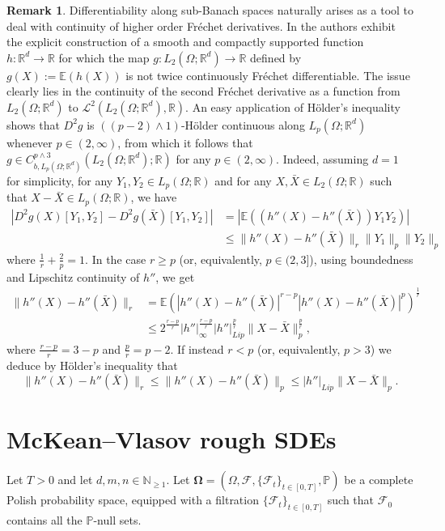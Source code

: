 \documentclass[10pt, a4paper]{article} %
\newcommand{\R}{\mathbb{R}}
\newcommand{\E}{\mathbb{E}}
\theoremstyle{definition}
\newtheorem{rmk}[defn]{Remark}
\theoremstyle{plain}
\begin{document}
\begin{rmk} \label{rmk:counterexampleCD}
    Differentiability along sub-Banach spaces naturally arises as a tool to deal with continuity of higher order Fréchet derivatives. 
    In \cite[Remark 5.80]{CARMONADELARUE_volumeI} the authors exhibit the explicit construction of a smooth and compactly supported function $h:\R^d \to \R$ for which the map $g : L_2(\Omega;\R^d) \to \R$ defined by $g(X) := \E(h(X))$ is not twice continuously Fréchet differentiable. 
    The issue clearly lies in the continuity of the second Fréchet derivative as a function from $L_2(\Omega;\R^d)$ to $\mathscr{L}^2(L_2(\Omega;\R^d),\R)$.
    An easy application of H\"older's inequality shows that $D^2g$ is $((p-2) \wedge 1)$-H\"older continuous along $L_p(\Omega;\R^d)$ whenever $p \in (2,\infty)$, from which it follows that $g \in C^{p\wedge 3}_{b,L_p(\Omega;\R^d)}(L_2(\Omega;\R^d);\R)$ for any $p \in (2,\infty)$. 
    Indeed, assuming $d=1$ for simplicity, for any $Y_1,Y_2 \in L_p(\Omega;\R)$ and for any $X,\bar X \in L_2(\Omega;\R)$ such that $X - \bar X \in L_p(\Omega;\R)$, we have \begin{align*}
        |D^2g(X) [Y_1,Y_2] - D^2g(\bar X) [Y_1,Y_2] | &= |\E( (h''(X) - h''(\bar X)) Y_1 Y_2)| \\
        &\le \|h''(X) -h''(\bar X)\|_r \|Y_1\|_p \|Y_2\|_p
    \end{align*}
    where $\frac{1}{r} + \frac{2}{p} = 1$.
    In the case $r \ge p$ (or, equivalently, $p \in (2,3]$), using boundedness and Lipschitz continuity of $h''$, we get
    \begin{align*} 
        \|h''(X) - h''(\bar X)\|_r &= \E(|h''(X) - h''(\bar X)|^{r-p} |h''(X) - h''(\bar X)|^{p})^\frac{1}{r} \\
        &\le 2^{\frac{r-p}{r}} |h''|_\infty^{\frac{r-p}{r}} |h''|_{Lip}^\frac{p}{r} \|X- \bar X\|_p ^{\frac{p}{r}} ,
    \end{align*}
    where $\frac{r-p}{r}=3-p$ and $\frac{p}{r} = p-2$. {If instead $r < p$} (or, equivalently, $p > 3$) we deduce by H\"older's inequality that \begin{equation*}
        \|h''(X) - h''(\bar X)\|_r \le \|h''(X) - h''(\bar X)\|_p \le |h''|_{Lip} \|X- \bar X\|_p .
    \end{equation*}
\end{rmk}

\section{McKean--Vlasov rough SDEs} \label{section:McKean--ValsovroughSDEs}
Let $T>0$ and let $d,m,n \in \mathbb{N}_{\ge 1}$. Let $\mathbf{\Omega}=(\Omega,\mathcal{F},\{\mathcal{F}_t\}_{t \in [0,T]},\mathbb{P})$ be a complete Polish probability space, equipped with a filtration $\{\mathcal{F}_t\}_{t \in [0,T]}$ such that $\mathcal{F}_0$ contains all the $\mathbb{P}$-null sets. 
\end{document}
